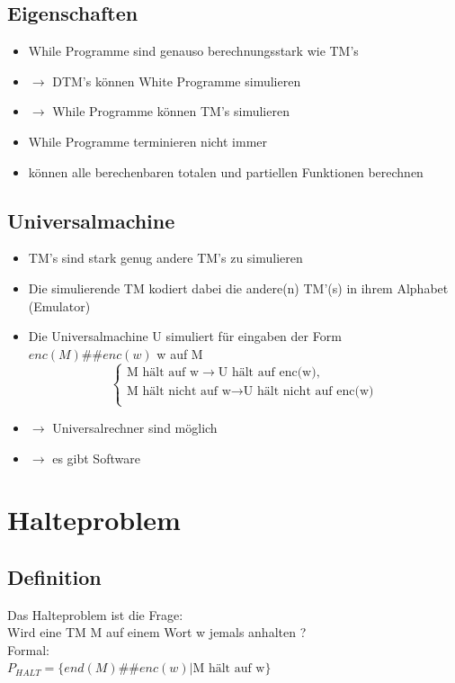 \documentclass[12pt,a4paper]{article}
\begin{document}
\subsection{Eigenschaften}
\begin{itemize}
\item While Programme sind genauso berechnungsstark wie TM's
\item  $\rightarrow$ DTM's können White Programme simulieren
\item $\rightarrow$ While Programme können TM's simulieren
\item While Programme terminieren nicht immer
\item können alle berechenbaren totalen und partiellen Funktionen berechnen
\end{itemize}

\subsection{Universalmachine}
\begin{itemize}
\item TM's sind stark genug andere TM's zu simulieren
\item Die simulierende TM kodiert dabei die andere(n) TM'(s) in ihrem Alphabet (Emulator)
\item Die Universalmachine U simuliert für eingaben der Form $enc(M)\#\#enc(w)$ w auf M$$
\begin{cases}
\text{M hält auf w} \rightarrow \text{U hält auf enc(w)},\\
\text{M hält nicht auf w} \rightarrow \text{U hält nicht auf enc(w)}\\
\end{cases}
$$
\item $\rightarrow$ Universalrechner sind möglich
\item $\rightarrow$ es gibt Software
\end{itemize}

\section{Halteproblem}
\subsection{Definition}
Das Halteproblem ist die Frage:\\
Wird eine TM M auf einem Wort w jemals anhalten ?\\
Formal:\\
$P_{HALT} = \{end(M)\#\# enc(w) | \text{M hält auf w}\}$
\end{document}
